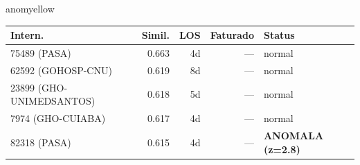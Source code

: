 \documentclass[a4paper,10pt]{article}
\begin{document}
\begin{anomalycard}[Internacao 113696 | GHO-BRADESCO | MODERADO (z=2.21)]{anomyellow}
\begin{tabular}{l r r r l}\toprule\textbf{Intern.} & \textbf{Simil.} & \textbf{LOS} & \textbf{Faturado} & \textbf{Status} \\\midrule
75489 (PASA) & 0.663 & 4d & --- & \textcolor{jcubeblue}{normal} \\
62592 (GOHOSP-CNU) & 0.619 & 8d & --- & \textcolor{jcubeblue}{normal} \\
23899 (GHO-UNIMEDSANTOS) & 0.618 & 5d & --- & \textcolor{jcubeblue}{normal} \\
7974 (GHO-CUIABA) & 0.617 & 4d & --- & \textcolor{jcubeblue}{normal} \\
82318 (PASA) & 0.615 & 4d & --- & \textcolor{anomred}{\textbf{ANOMALA (z=2.8)}} \\
\bottomrule\end{tabular}


\end{anomalycard}

\newpage
\end{document}
